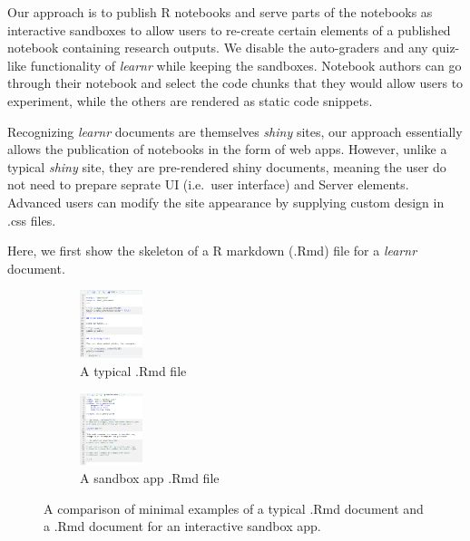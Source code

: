 Our approach is to publish R notebooks and serve parts of the notebooks
as interactive sandboxes to allow users to re-create certain elements of
a published notebook containing research outputs. We disable the
auto-graders and any quiz-like functionality of \emph{learnr} while
keeping the sandboxes. Notebook authors can go through their notebook
and select the code chunks that they would allow users to experiment,
while the others are rendered as static code snippets.

Recognizing \emph{learnr} documents are themselves \emph{shiny} sites,
our approach essentially allows the publication of notebooks in the form
of web apps. However, unlike a typical \emph{shiny} site, they are
pre-rendered shiny documents, meaning the user do not need to prepare
seprate UI (i.e.~user interface) and Server elements. Advanced users can
modify the site appearance by supplying custom design in .css files.

Here, we first show the skeleton of a R markdown (.Rmd) file for a
\emph{learnr} document.

\begin{figure}
     \centering
     \begin{subfigure}[b]{0.2\textwidth}
         \centering
         \includegraphics[width=0.2\textwidth]{skeleton-md}
         \caption{A typical .Rmd file}
     \end{subfigure}
     \hfill
     \begin{subfigure}[b]{0.2\textwidth}
         \centering
         \includegraphics[width=0.2\textwidth]{skeleton}
         \caption{A sandbox app .Rmd file}
     \end{subfigure}

\caption[A comparison of minimal examples of a typical .Rmd document and a .Rmd document for an interactive sandbox app]{A comparison of minimal examples of a typical .Rmd document and a .Rmd document for an interactive sandbox app.}\label{fig:fig_skeleton}
\end{figure}



